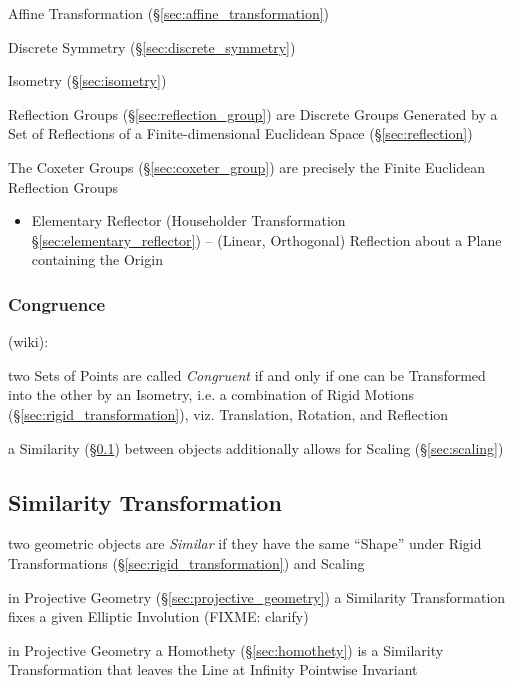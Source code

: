 Affine Transformation (\S\ref{sec:affine_transformation})

Discrete Symmetry (\S\ref{sec:discrete_symmetry})

Isometry (\S\ref{sec:isometry})

Reflection Groups (\S\ref{sec:reflection_group}) are Discrete Groups Generated
by a Set of Reflections of a Finite-dimensional Euclidean Space
(\S\ref{sec:reflection})

The Coxeter Groups (\S\ref{sec:coxeter_group}) are precisely the Finite
Euclidean Reflection Groups

\begin{itemize}
  \item Elementary Reflector (Householder Transformation
    \S\ref{sec:elementary_reflector}) -- (Linear, Orthogonal) Reflection about
    a Plane containing the Origin
\end{itemize}



\subsubsection{Congruence}\label{sec:congruence}

(wiki):

two Sets of Points are called \emph{Congruent} if and only if one can be
Transformed into the other by an Isometry, i.e. a combination of Rigid Motions
(\S\ref{sec:rigid_transformation}), viz. Translation, Rotation, and Reflection

\fist a Similarity (\S\ref{sec:similarity_transformation}) between objects
additionally allows for Scaling (\S\ref{sec:scaling})



\subsection{Similarity Transformation}\label{sec:similarity_transformation}

two geometric objects are \emph{Similar} if they have the same ``Shape'' under
Rigid Transformations (\S\ref{sec:rigid_transformation}) and Scaling

in Projective Geometry (\S\ref{sec:projective_geometry}) a Similarity
Transformation fixes a given Elliptic Involution (FIXME: clarify)

in Projective Geometry a Homothety (\S\ref{sec:homothety}) is a Similarity
Transformation that leaves the Line at Infinity Pointwise Invariant

